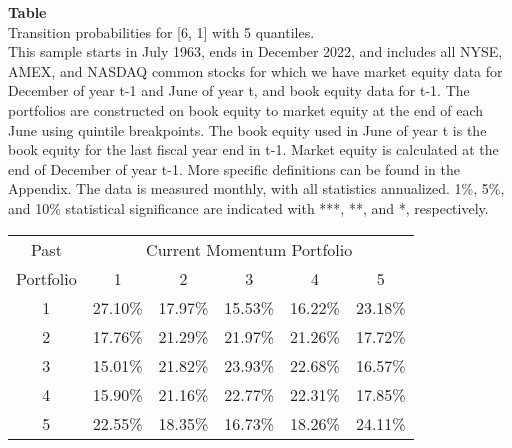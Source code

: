 \begin{table*}[ht!]
\raggedright
{}
\label{tab: transition_probs_[6, 1]_with_5_quantiles}
\textbf{Table \thetable} \\
Transition probabilities for [6, 1] with 5 quantiles. \\
\hspace*{1em}This sample starts in July 1963, ends in December 2022, and includes all NYSE, AMEX, and NASDAQ common stocks for which we have market equity data for December of year t-1 and June of year t, and book equity data for t-1. The portfolios are constructed on book equity to market equity at the end of each June using quintile breakpoints.  The book equity used in June of year t is the book equity for the last fiscal year end in t-1.  Market equity is calculated at the end of December of year t-1.  More specific definitions can be found in the Appendix.  The data is measured monthly, with all statistics annualized.  1\%, 5\%, and 10\% statistical significance are indicated with ***, **, and *, respectively. \\
\vspace{0.5em}
\centering
\begin{adjustbox}{max width=\textwidth}
\begin{tabular}{@{}cccccc@{}}
\toprule
Past & \multicolumn{5}{c}{Current Momentum Portfolio} \\
Portfolio & 1 & 2 & 3 & 4 & 5 \\
\midrule
1 & 27.10\% & 17.97\% & 15.53\% & 16.22\% & 23.18\% \\
2 & 17.76\% & 21.29\% & 21.97\% & 21.26\% & 17.72\% \\
3 & 15.01\% & 21.82\% & 23.93\% & 22.68\% & 16.57\% \\
4 & 15.90\% & 21.16\% & 22.77\% & 22.31\% & 17.85\% \\
5 & 22.55\% & 18.35\% & 16.73\% & 18.26\% & 24.11\% \\
\bottomrule
\end{tabular}
\end{adjustbox}
\end{table*}